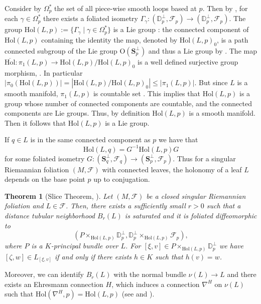 \documentclass[12pt,a4paper,reqno]{amsart}
\newcommand{\1}{\mathbbm{1}} %
\newcommand{\D}{\mathbb{D}} %
\newcommand{\fol}{\mathcal{F}} %
\newcommand{\Sp}{\mathbf{S}} %
\newtheorem{thm}{Theorem}[section]
\theoremstyle{definition}
\theoremstyle{TheoremNum}
\begin{document}
Consider by $\Omega_p^\ast$ the set of all piece-wise smooth loops based at $p$. Then by \cite{MendesRadeschi2015}, for each $\gamma\in \Omega_p^\ast$ there exists a foliated isometry $\Gamma_\gamma\colon (\D^\perp_p,\fol_p)\to (\D^\perp_p,\fol_p)$. The group $\mathrm{Hol}(L,p):= \{\Gamma_\gamma\mid\gamma\in \Omega_p^\ast\}$ is a Lie group \cite{Radeschi-notes}: the connected component of $\mathrm{Hol}(L,p)$ containing the identity the map, denoted by $\mathrm{Hol}(L,p)_0$, is a path connected subgroup of the Lie group $\mathrm{O}(\Sp^\perp_p)$ and thus a Lie group by \cite{Yamabe1950}. The map $\overline{\mathrm{Hol}}\colon \pi_1(L,p)\to \mathrm{Hol}(L,p)/\mathrm{Hol}(L,p)_0$ is a  well defined surjective group morphism, \cite[Corollary A.5]{Corro}. In particular $|\pi_0(\mathrm{Hol}(L,p))|= |\mathrm{Hol}(L,p)/\mathrm{Hol}(L,p)_0|\leq |\pi_1(L,p)|$. But since $L$ is a smooth manifold, $\pi_1(L,p)$ is countable set \cite[Prop. 1.16]{Lee}. This implies that $\mathrm{Hol}(L,p)$ is a group whose number of connected components are countable, and the connected components are Lie groups. Thus, by definition $\mathrm{Hol}(L,p)$ is a smooth manifold. Then it follows that $\mathrm{Hol}(L,p)$ is a Lie group.

If $q\in L$ is in the same connected component as $p$ we have that
\[
\mathrm{Hol}(L,q)= G^{-1}\mathrm{Hol}(L,p)G
\]
for some foliated isometry $G\colon (\Sp_q^\perp,\fol_q)\to (\Sp^\perp_p,\fol_p)$. Thus for a singular Riemannian foliation $(M,\mathcal{F})$ with connected leaves, the holonomy of a leaf $L$ depends on the base point $p$ up to conjugation. 

\begin{thm}[Slice Theorem, \cite{MendesRadeschi2015}]\th\label{T: Slice Theorem}
Let $(M,\fol)$ be a closed singular Riemannian foliation and $L\in \fol$. Then, there exists a sufficiently small $r>0$ such that a distance tubular neighborhood $B_r(L)$ is saturated and it is foliated diffeomorphic to 
\[
	(P\times_{\mathrm{Hol}(L,p)} \D^\perp_p,\D^\perp_p\times_{\mathrm{Hol}(L,p)} \fol_p),
\]
where $P$ is a $K$-principal bundle over $L$. For $[\xi,v]\in P\times_{\mathrm{Hol}(L,p)} \D^\perp_p$ we have $[\zeta,w]\in L_{[\xi,v]}$ if and only if there exists $h\in K$ such that $h(v)=w$.
\end{thm}

Moreover, we can identify $B_r(L)$ with the normal bundle $\nu(L)\to L$ and there exists an Ehresmann connection $H$, which induces a connection $\nabla^H$  on $\nu(L)$ such that $\mathrm{Hol}(\nabla^H,p)= \mathrm{Hol}(L,p)$ (see \cite{AlexandrinoInagakiStruchiner2018} and \cite{Alexandrino2010}). 
\end{document}

